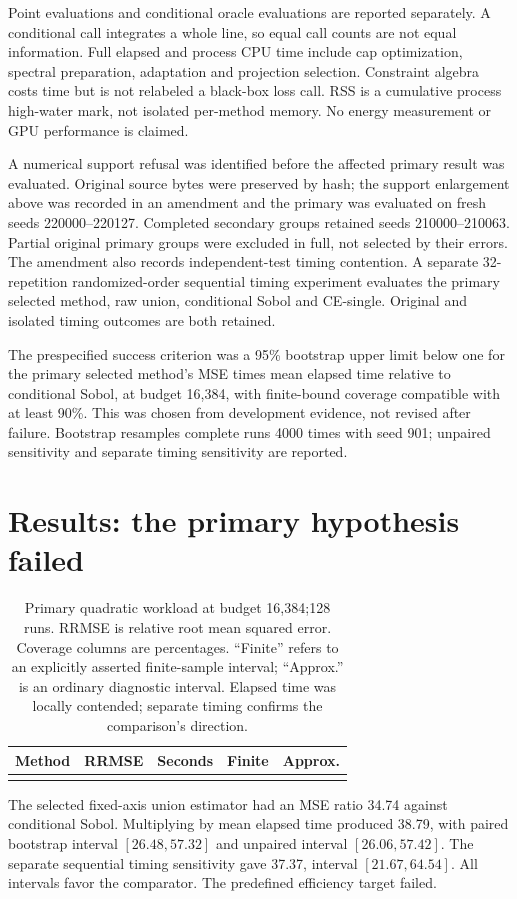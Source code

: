 \documentclass[11pt]{article}
\begin{document}
Point evaluations and conditional oracle evaluations are reported separately. A conditional call integrates a whole line, so equal call counts are not equal information. Full elapsed and process CPU time include cap optimization, spectral preparation, adaptation and projection selection. Constraint algebra costs time but is not relabeled a black-box loss call. RSS is a cumulative process high-water mark, not isolated per-method memory. No energy measurement or GPU performance is claimed.

A numerical support refusal was identified before the affected primary result was evaluated. Original source bytes were preserved by hash; the support enlargement above was recorded in an amendment and the primary was evaluated on fresh seeds 220000--220127. Completed secondary groups retained seeds 210000--210063. Partial original primary groups were excluded in full, not selected by their errors. The amendment also records independent-test timing contention. A separate 32-repetition randomized-order sequential timing experiment evaluates the primary selected method, raw union, conditional Sobol and CE-single. Original and isolated timing outcomes are both retained.

The prespecified success criterion was a 95\% bootstrap upper limit below one for the primary selected method's MSE times mean elapsed time relative to conditional Sobol, at budget 16,384, with finite-bound coverage compatible with at least 90\%. This was chosen from development evidence, not revised after failure. Bootstrap resamples complete runs 4000 times with seed 901; unpaired sensitivity and separate timing sensitivity are reported.

\section{Results: the primary hypothesis failed}
\begin{table}[t]
\centering\small
\caption{Primary quadratic workload at budget 16,384;128 runs. RRMSE is relative root mean squared error. Coverage columns are percentages. ``Finite'' refers to an explicitly asserted finite-sample interval; ``Approx.'' is an ordinary diagnostic interval. Elapsed time was locally contended; separate timing confirms the comparison's direction.}
\begin{tabular}{lrrrr}\toprule
Method & RRMSE & Seconds & Finite & Approx.\\\midrule

\\[-7pt]\bottomrule
\end{tabular}
\end{table}
The selected fixed-axis union estimator had an MSE ratio 34.74 against conditional Sobol. Multiplying by mean elapsed time produced 38.79, with paired bootstrap interval $[26.48,57.32]$ and unpaired interval $[26.06,57.42]$. The separate sequential timing sensitivity gave 37.37, interval $[21.67,64.54]$. All intervals favor the comparator. The predefined efficiency target failed.
\end{document}
